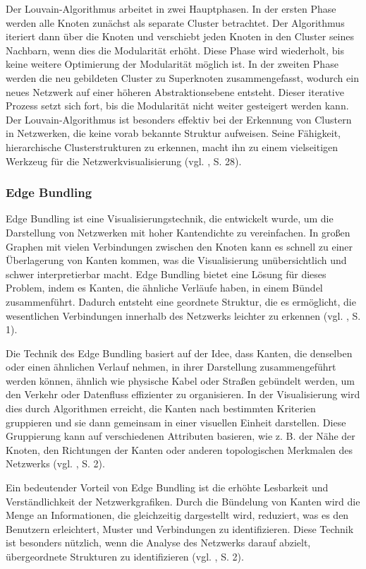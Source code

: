 Der Louvain-Algorithmus arbeitet in zwei Hauptphasen. In der ersten Phase werden alle Knoten zunächst als separate Cluster betrachtet. Der Algorithmus iteriert dann über die Knoten und verschiebt jeden Knoten in den Cluster seines Nachbarn, wenn dies die Modularität erhöht. Diese Phase wird wiederholt, bis keine weitere Optimierung der Modularität möglich ist. In der zweiten Phase werden die neu gebildeten Cluster zu Superknoten zusammengefasst, wodurch ein neues Netzwerk auf einer höheren Abstraktionsebene entsteht. Dieser iterative Prozess setzt sich fort, bis die Modularität nicht weiter gesteigert werden kann. Der Louvain-Algorithmus ist besonders effektiv bei der Erkennung von Clustern in Netzwerken, die keine vorab bekannte Struktur aufweisen. Seine Fähigkeit, hierarchische Clusterstrukturen zu erkennen, macht ihn zu einem vielseitigen Werkzeug für die Netzwerkvisualisierung (vgl. \cite{louvain:Que}, S. 28).

\subsubsection{Edge Bundling}

Edge Bundling ist eine Visualisierungstechnik, die entwickelt wurde, um die Darstellung von Netzwerken mit hoher Kantendichte zu vereinfachen. In großen Graphen mit vielen Verbindungen zwischen den Knoten kann es schnell zu einer Überlagerung von Kanten kommen, was die Visualisierung unübersichtlich und schwer interpretierbar macht. Edge Bundling bietet eine Lösung für dieses Problem, indem es Kanten, die ähnliche Verläufe haben, in einem Bündel zusammenführt. Dadurch entsteht eine geordnete Struktur, die es ermöglicht, die wesentlichen Verbindungen innerhalb des Netzwerks leichter zu erkennen (vgl. \cite{edgeBundling:Holten}, S. 1).

Die Technik des Edge Bundling basiert auf der Idee, dass Kanten, die denselben oder einen ähnlichen Verlauf nehmen, in ihrer Darstellung zusammengeführt werden können, ähnlich wie physische Kabel oder Straßen gebündelt werden, um den Verkehr oder Datenfluss effizienter zu organisieren. In der Visualisierung wird dies durch Algorithmen erreicht, die Kanten nach bestimmten Kriterien gruppieren und sie dann gemeinsam in einer visuellen Einheit darstellen. Diese Gruppierung kann auf verschiedenen Attributen basieren, wie z. B. der Nähe der Knoten, den Richtungen der Kanten oder anderen topologischen Merkmalen des Netzwerks (vgl. \cite{edgeBundling:Holten}, S. 2).

Ein bedeutender Vorteil von Edge Bundling ist die erhöhte Lesbarkeit und Verständlichkeit der Netzwerkgrafiken. Durch die Bündelung von Kanten wird die Menge an Informationen, die gleichzeitig dargestellt wird, reduziert, was es den Benutzern erleichtert, Muster und Verbindungen zu identifizieren. Diese Technik ist besonders nützlich, wenn die Analyse des Netzwerks darauf abzielt, übergeordnete Strukturen zu identifizieren (vgl. \cite{edgeBundling:Holten}, S. 2).


